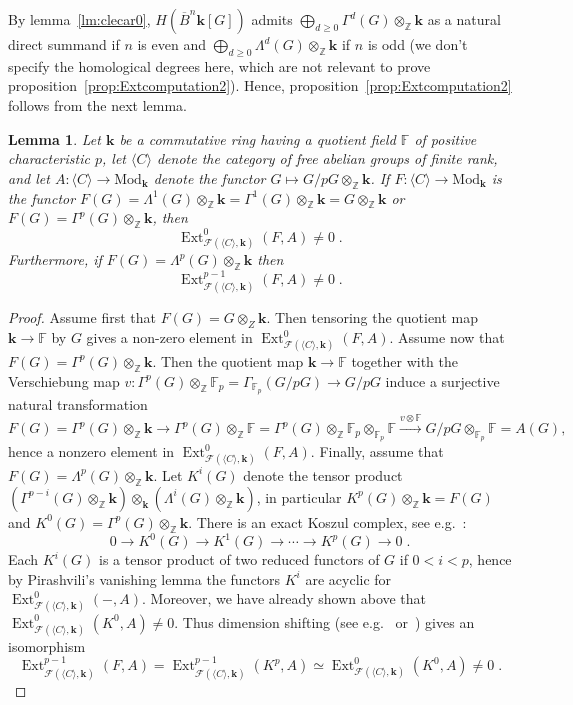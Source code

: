 \documentclass{amsart}
\newtheorem{lemma}[formula]{Lemma}
\theoremstyle{definition}
\theoremstyle{remark}
\newcommand{\Z}{\mathbb Z}
\newcommand{\F}{\mathbb F}
\DeclareMathOperator{\Ext}{Ext}
\renewcommand{\ge}{\geqslant}
\def\k{\mathbf{k}}
\begin{document}
By lemma~\ref{lm:clecar0}, $H(\overline{B}^n\k[G])$ admits $\bigoplus_{d\ge 0}\Gamma^d(G)\otimes_\Z\k$ as a natural direct summand if $n$ is even and $\bigoplus_{d\ge 0}\Lambda^d(G)\otimes_\Z\k$  if $n$ is odd (we don't specify the homological degrees here, which are not relevant to prove proposition~\ref{prop:Extcomputation2}). Hence, proposition~\ref{prop:Extcomputation2} follows from the next lemma.
\begin{lemma}
	Let $\k$ be a commutative ring having a quotient field $\F$ of positive characteristic $p$, let $\langle C\rangle$ denote the category of free abelian groups of finite rank, and let $A:\langle C\rangle\to \mathrm{Mod}_\k$ denote the functor $G\mapsto G/pG\otimes_\Z\k$. 
	If $F\colon\langle C\rangle\to \mathrm{Mod}_\k$ is the functor $F(G)=\Lambda^1(G)\otimes_\Z\k=\Gamma^1(G)\otimes_\Z\k=G\otimes_\Z\k$ or $F(G)=\Gamma^p(G)\otimes_\Z\k$, then
	\[
		\Ext^0_{\mathcal{F}(\langle C\rangle,\k)}(F,A)\ne 0\;.
	\]
	Furthermore, if $F(G)=\Lambda^p(G)\otimes_\Z\k$ then 
	\[
		\Ext^{p-1}_{\mathcal{F}(\langle C\rangle,\k)}(F,A)\ne 0\;.
	\]
\end{lemma}
\begin{proof}
	Assume first that $F(G)=G\otimes_Z\k$. Then tensoring the quotient map $\k\to\F$ by $G$ gives a non-zero element in $\Ext^0_{\mathcal{F}(\langle C\rangle,\k)}(F,A)$. 
	Assume now that $F(G)=\Gamma^p(G)\otimes_\Z\k$. Then the quotient map $\k\to\F$ together with the Verschiebung map $v\colon\Gamma^p(G)\otimes_\Z\F_p=\Gamma_{\F_p}(G/pG)\to G/pG$ induce a surjective natural transformation
	\[
		F(G)=\Gamma^p(G)\otimes_\Z\k\to 	\Gamma^p(G)\otimes_\Z\F=\Gamma^p(G)\otimes_\Z\F_p\otimes_{\F_p}\F\xrightarrow[]{v\otimes\F} G/pG\otimes_{\F_p}\F=A(G),
	\]
	hence a nonzero element in $\Ext^0_{\mathcal{F}(\langle C\rangle,\k)}(F,A)$. Finally, assume that $F(G)=\Lambda^p(G)\otimes_\Z\k$. 
	Let $K^i(G)$ denote the tensor product $(\Gamma^{p-i}(G)\otimes_\Z\k)\otimes_\k (\Lambda^i(G)\otimes_\Z\k)$, in particular $K^p(G)\otimes_\Z\k=F(G)$ and $K^0(G)=\Gamma^p(G)\otimes_\Z\k$.
	There is an exact Koszul complex, see e.g.~\cite[sec.~6.2.1]{br-mi-to-16}:
	\[
		0\to K^0(G)\to K^1(G)\to \cdots\to K^p(G)\to 0\;.
	\] 
	Each $K^i(G)$ is a tensor product of two reduced functors of $G$ if $0<i<p$, hence by Pirashvili's vanishing lemma the functors $K^i$ are acyclic for $\Ext^0_{\mathcal{F}(\langle C\rangle,\k)}(-,A)$. Moreover, we have already shown above that $\Ext^0_{\mathcal{F}(\langle C\rangle,\k)}(K^0,A)\ne 0$. Thus dimension shifting (see e.g.~\cite[Exercise~2.4.3,~p.47]{we-97} or~\cite[III~Section~7]{br-94}) gives an isomorphism
	\[
		\Ext^{p-1}_{\mathcal{F}(\langle 	C\rangle,\k)}(F,A)=\Ext^{p-1}_{\mathcal{F}(\langle C\rangle,\k)}(K^p,A)\simeq \Ext^0_{\mathcal{F}(\langle C\rangle,\k)}(K^0,A)\ne 0\;.
	\]
\end{proof}
\end{document}
